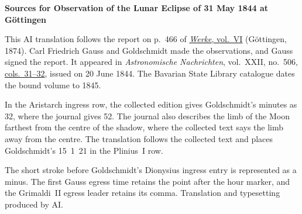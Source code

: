 \clearpage\thispagestyle{empty}
\begin{center}\textbf{Sources for Observation of the Lunar Eclipse of 31 May 1844 at Göttingen}\end{center}
\noindent This AI translation follows the report on p.~466 of \href{https://gdz.sub.uni-goettingen.de/id/PPN236007467}{\textit{Werke}, vol.~VI} (Göttingen, 1874). Carl Friedrich Gauss and Goldschmidt made the observations, and Gauss signed the report. It appeared in \textit{Astronomische Nachrichten}, vol.~XXII, no.~506, \href{https://api.digitale-sammlungen.de/iiif/image/v2/bsb10049447_00024/full/1800,/0/default.jpg}{cols.~31--32}, issued on 20 June 1844. The Bavarian State Library catalogue dates the bound volume to 1845.
\par\smallskip\noindent In the Aristarch ingress row, the collected edition gives Goldschmidt’s minutes as 32, where the journal gives 52. The journal also describes the limb of the Moon farthest from the centre of the shadow, where the collected text says the limb away from the centre. The translation follows the collected text and places Goldschmidt’s 15~1~21 in the Plinius~I row.
\par\smallskip\noindent The short stroke before Goldschmidt’s Dionysius ingress entry is represented as a minus. The first Gauss egress time retains the point after the hour marker, and the Grimaldi~II egress leader retains its comma. Translation and typesetting produced by AI.
\clearpage
